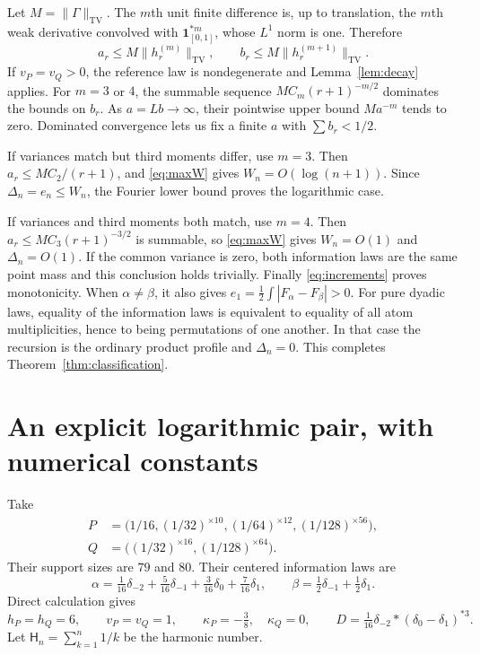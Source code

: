 \documentclass[11pt,a4paper]{article}
\newcommand{\TV}{\mathrm{TV}}
\begin{document}
Let $M=\|\Gamma\|_{\TV}$. The $m$th unit finite difference is, up to
translation, the $m$th weak derivative convolved with
$\mathbf1_{[0,1]}^{*m}$, whose $L^1$ norm is one. Therefore
\begin{equation}\label{eq:ab}
a_r\le M\|h_r^{(m)}\|_{\TV},\qquad
b_r\le M\|h_r^{(m+1)}\|_{\TV}.
\end{equation}
If $v_P=v_Q>0$, the reference law is nondegenerate and
Lemma~\ref{lem:decay} applies.
For $m=3$ or $4$, the summable sequence
$MC_m(r+1)^{-m/2}$ dominates the bounds on $b_r$.
As $a=Lb\to\infty$, their pointwise upper bound $Ma^{-m}$ tends to
zero. Dominated convergence lets us fix a finite $a$ with
$\sum b_r<1/2$.

If variances match but third moments differ, use $m=3$.
Then $a_r\le MC_2/(r+1)$, and \eqref{eq:maxW} gives
$W_n=O(\log(n+1))$. Since $\Delta_n=e_n\le W_n$, the Fourier lower
bound proves the logarithmic case.

If variances and third moments both match, use $m=4$.
Then $a_r\le MC_3(r+1)^{-3/2}$ is summable, so
\eqref{eq:maxW} gives $W_n=O(1)$ and $\Delta_n=O(1)$.
If the common variance is zero, both information laws are the same point
mass and this conclusion holds trivially.
Finally \eqref{eq:increments} proves monotonicity. When
$\alpha\ne\beta$, it also gives
$e_1=\tfrac12\int|F_\alpha-F_\beta|>0$.
For pure dyadic laws, equality of the information laws is equivalent to
equality of all atom multiplicities, hence to being permutations of one
another. In that case the recursion is the ordinary product profile and
$\Delta_n=0$. This completes Theorem~\ref{thm:classification}.

\section{An explicit logarithmic pair, with numerical constants}
Take
\begin{align*}
P&=\bigl(1/16,(1/32)^{\times10},(1/64)^{\times12},
                       (1/128)^{\times56}\bigr),\\
Q&=\bigl((1/32)^{\times16},(1/128)^{\times64}\bigr).
\end{align*}
Their support sizes are $79$ and $80$. Their centered information laws are
\[
\alpha=\tfrac1{16}\delta_{-2}+\tfrac5{16}\delta_{-1}
       +\tfrac3{16}\delta_0+\tfrac7{16}\delta_1,
\qquad \beta=\tfrac12\delta_{-1}+\tfrac12\delta_1.
\]
Direct calculation gives
\[
h_P=h_Q=6,\qquad v_P=v_Q=1,\qquad
\kappa_P=-\tfrac38,\quad\kappa_Q=0,\qquad
D=\tfrac1{16}\delta_{-2}*(\delta_0-\delta_1)^{*3}.
\]
Let $\mathsf H_n=\sum_{k=1}^n1/k$ be the harmonic number.
\end{document}
